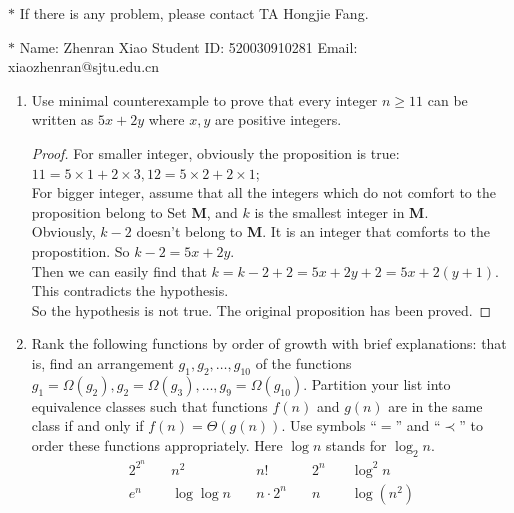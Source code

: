 \documentclass[12pt,a4paper]{article}
\theoremstyle{definition}
\begin{document}
\noindent

\noindent{}
\begin{center}
\footnotesize{\color{red}$*$ If there is any problem, please contact TA Hongjie Fang.}

\footnotesize{\color{blue}$*$ Name: Zhenran Xiao  \quad Student ID: 520030910281 \quad Email: xiaozhenran@sjtu.edu.cn}
\end{center}

\begin{enumerate}
	\item Use minimal counterexample to prove that every integer $n \ge 11$ can be written as $5x + 2y$ where $x, y$ are positive integers.
	
	    \begin{proof}
	        For smaller integer, obviously the proposition is true:\\ $11=5\times1+2\times3, 12=5\times2+2\times1$;\\
	        For bigger integer, assume that all the integers which do not comfort to the proposition belong to Set \textbf{M}, and $k$ is the smallest integer in \textbf{M}. \\
	        Obviously, $k-2$ doesn't belong to \textbf{M}. It is an integer that comforts to the propostition. So $k-2 = 5x+2y$.\\
	        Then we can easily find that $k=k-2+2=5x+2y+2=5x+2(y+1)$. This contradicts the hypothesis.\\
	        So the hypothesis is not true. The original proposition has been proved.        
	    \end{proof}
	
    \item Rank the following functions by order of growth with brief explanations: that is, find an arrangement $g_1, g_2, \ldots , g_{10}$ of the functions $g_1 = \Omega(g_2), g_2 = \Omega(g_3), \ldots, g_{9} = \Omega(g_{10})$. Partition your list into equivalence classes such that functions $f(n)$ and $g(n)$ are in the same class if and only if $f(n) = \Theta(g(n))$. Use symbols ``$=$'' and ``$\prec$'' to order these functions appropriately. Here $\log n$ stands for $\log_2 n$.
    $$
    \begin{array}{ccccc}
    2^{2^n} \quad & n^2 \quad & n! \quad & 2^n \quad & \log^2 n \\
    e^n \quad & \log\log n \quad & n\cdot 2^n \quad & n \quad & \log (n^2) \\
    \end{array}
    $$
    

\end{enumerate}
\end{document}
